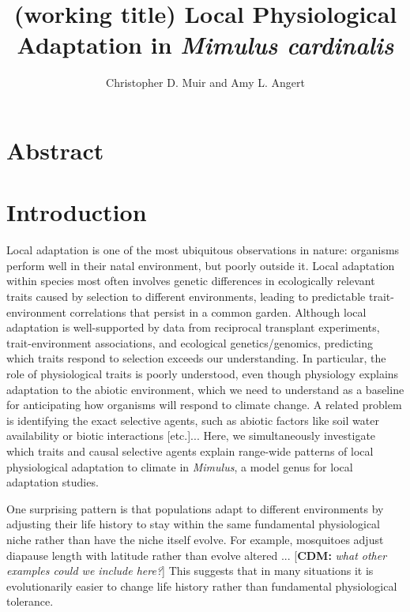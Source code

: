 \documentclass[11pt, oneside]{article}\usepackage[]{graphicx}\usepackage[]{color}
\title{(working title) Local Physiological Adaptation in \textit{Mimulus cardinalis}}
\author{Christopher D. Muir and Amy L. Angert}
\newcommand{\cdm}[1]{{ \color{magenta} [{\bf{CDM:}} {\em#1}]}} %
\begin{document}
\maketitle
\listoffigures
\listoftables

\section*{Abstract}


\section*{Introduction}

Local adaptation is one of the most ubiquitous observations in nature: organisms perform well in their natal environment, but poorly outside it. Local adaptation within species most often involves genetic differences in ecologically relevant traits caused by selection to different environments, leading to predictable trait-environment correlations that persist in a common garden. Although local adaptation is well-supported by data from reciprocal transplant experiments, trait-environment associations, and ecological genetics/genomics, predicting which traits respond to selection exceeds our understanding. In particular, the role of physiological traits is poorly understood, even though physiology explains adaptation to the abiotic environment, which we need to understand as a baseline for anticipating how organisms will respond to climate change. A related problem is identifying the exact selective agents, such as abiotic factors like soil water availability or biotic interactions [etc.]... Here, we simultaneously investigate which traits and causal selective agents explain range-wide patterns of local physiological adaptation to climate in \textit{Mimulus}, a model genus for local adaptation studies.

One surprising pattern is that populations adapt to different environments by adjusting their life history to stay within the same fundamental physiological niche rather than have the niche itself evolve. For example, mosquitoes adjust diapause length with latitude rather than evolve altered ...\cdm{what other examples could we include here?} This suggests that in many situations it is evolutionarily easier to change life history rather than fundamental physiological tolerance.
\end{document}
